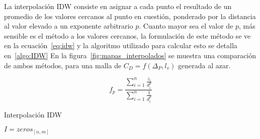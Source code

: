La interpolación IDW consiste en asignar a cada punto el resultado de un
promedio de los valores cercanos al punto en cuestión, ponderado por la
distancia al valor elevado a un exponente arbitrario $p$.
%
Cuanto mayor sea el valor de $p$, más sensible es el método a los valores
cercanos, la formulación de este método se ve en la ecuación~\ref{eq:idw} y la
algoritmo utilizado para calcular esto se detalla en~\ref{algo:IDW}
%
En la figura~\ref{fig:mapas_interpolados} se muestra una comparación de ambos
métodos, para una malla de $C_{D}=f(\Delta_{P}, l_{v})$ generada al azar.


\begin{equation} \label{eq:idw}
    f_p = \frac{\sum_{i=1}^{n} \frac{z_i}{d_i^p}} {\sum_{i=1}^{n}
    \frac{1}{d_i^p}}
\end{equation}


\begin{algorithm}
    \caption{Interpolación IDW}\label{algo:IDW}


    \BlankLine
    $I=zeros_{[n,m]}$\;
\end{algorithm}

